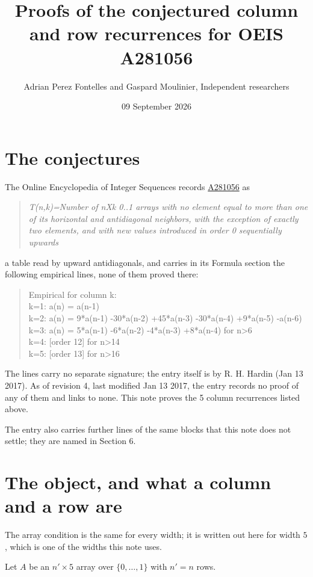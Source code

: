 \documentclass[11pt]{article}
\title{Proofs of the conjectured column and row recurrences for OEIS A281056}
\author{Adrian Perez Fontelles and Gaspard Moulinier, Independent researchers}
\date{09 September 2026}
\theoremstyle{definition}
\begin{document}
\maketitle
\section{The conjectures}

The Online Encyclopedia of Integer Sequences records \href{https://oeis.org/A281056}{A281056} as

\begin{quote}\itshape T(n,k)=Number of nXk 0..1 arrays with no element equal to more than one of its horizontal and antidiagonal neighbors, with the exception of exactly two elements, and with new values introduced in order 0 sequentially upwards\end{quote}

a table read by upward antidiagonals, and carries in its Formula section the following empirical lines, none of them proved there:

\begin{quote}\ttfamily Empirical for column k:\\
k=1: a(n) = a(n-1)\\k=2: a(n) = 9*a(n-1) -30*a(n-2) +45*a(n-3) -30*a(n-4) +9*a(n-5) -a(n-6)\\k=3: a(n) = 5*a(n-1) -6*a(n-2) -4*a(n-3) +8*a(n-4) for n>6\\k=4: [order 12] for n>14\\k=5: [order 13] for n>16\end{quote}

The lines carry no separate signature; the entry itself is by R. H. Hardin (Jan 13 2017). As of revision 4, last modified Jan 13 2017, the entry records no proof of any of them and links to none. This note proves the 5 column recurrences listed above.

The entry also carries further lines of the same blocks that this note does not settle; they are named in Section 6.

\section{The object, and what a column and a row are}

The array condition is the same for every width; it is written out here for width $5$, which is one of the widths this note uses.

Let $A$ be an $n' \times 5$ array over $\{0,\dots,1\}$ with $n' = n$ rows.
\end{document}
